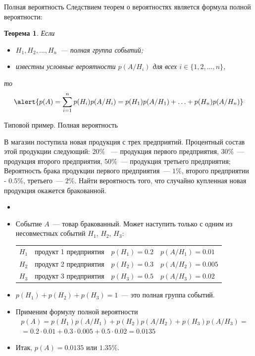 \documentclass[unicode,11pt,notheorems,xcolor=table]{beamer}
\newtheorem{theorem}{Теорема}
\begin{document}
\begin{frame}{Полная вероятность}
    Следствием теорем о вероятностях   является формула полной вероятности:
    \begin{theorem}{}
        Если 
        \begin{itemize}
            \item $H_1,H_2,\ldots, H_n$~--- полная группа событий;
            \item известны условные вероятности $p(A/H_i)$ для всех $i\in \{1,2,\ldots,n\}$,
        \end{itemize}
        то
        $$
           \alert{p(A) = \sum_{i=1}^n p(H_i)p(A/H_i) =p(H_1)p(A/H_1)+ \ldots+p(H_n)p(A/H_n)}
        $$
    \end{theorem}
\end{frame}
\begin{frame}[allowframebreaks]{Типовой пример. Полная вероятность}
    \begin{exampleblock}{}
        В магазин поступила новая продукция с трех предприятий. Процентный состав этой продукции следующий: $20\%$ ~--- продукция первого предприятия, $30\%$~--- продукция второго предприятия, $50\%$~--- продукция третьего предприятия; 
        Вероятность брака продукции первого предприятия~--- $1\%$, второго предприятии - $0.5\%$, третьего~--- $2\%$. Найти вероятность того, что случайно купленная новая продукция окажется бракованной.    
    \end{exampleblock}
    \begin{itemize}
    
        \item[] 
        \item Событие $A$~--- товар бракованный. Может наступить только с одним из несовместных событий $H_1$, $H_2$, $H_3$:
        \begin{tabular}{l@{\;---\;}l@{,\quad}l@{,\quad}l}
            $H_1$ & продукт 1 предприятия & $p(H_1)=0.2$ &$p(A/H_1)=0.01$\\
            $H_2$ & продукт 2 предприятия & $p(H_2)=0.3$ & $p(A/H_2)=0.005$\\
            $H_3$ & продукт 3 предприятия & $p(H_3)=0.5$ & $p(A/H_3)=0.02$\\
        \end{tabular}
        \item $p(H_1)+p(H_2)+p(H_3)=1$~--- это полная группа событий.
        \item Применим формулу полной вероятности
        \begin{multline*}
            p(A)= p(H_1)p(A/H_1)+p(H_2)p(A/H_2)+p(H_3)p(A/H_3)
            =\\
            = 0.2\cdot 0.01+ 0.3\cdot 0.005+ 0.5\cdot 0.02 
            = 0.0135
        \end{multline*}
        \item 
        Итак, $p(A)=0.0135$ или $1.35\%$.
    \end{itemize}
    
\end{frame}
\end{document}
